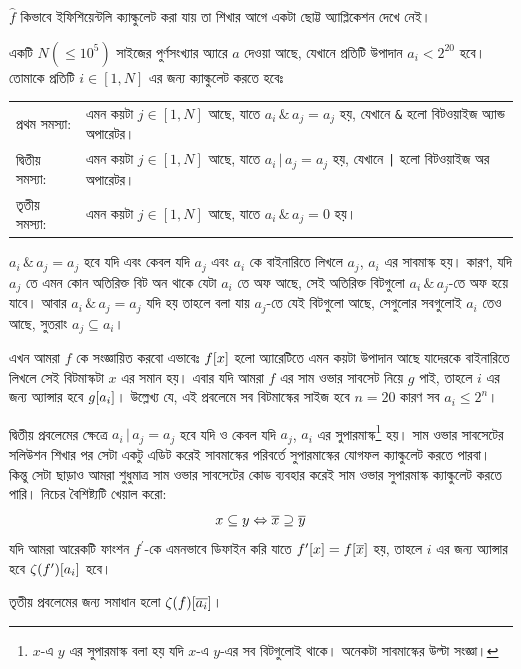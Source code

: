 $\hat{f}$ কিভাবে ইফিশিয়েন্টলি ক্যাল্কুলেট করা যায় তা শিখার আগে একটা ছোট্ট
অ্যাপ্লিকেশন দেখে নেই।

\begin{example}
  একটি $N (\le 10^5)$ সাইজের পুর্ণসংখ্যার অ্যারে $a$ দেওয়া আছে, যেখানে
  প্রতিটি উপাদান $a_i < 2^{20}$ হবে। তোমাকে প্রতিটি $i \in [1, N]$ এর জন্য
  ক্যাল্কুলেট করতে হবেঃ
  \begin{center}
    \begin{tabularx}{\textwidth}{l X}
      প্রথম সমস্যা: & এমন কয়টা $j \in [1, N]$ আছে, যাতে $a_i \, \texttt{\&}
      \, a_j = a_j$ হয়, যেখানে \texttt{\&} হলো বিটওয়াইজ অ্যান্ড অপারেটর।\\
      দ্বিতীয় সমস্যা: & এমন কয়টা $j \in [1, N]$ আছে, যাতে $a_i \, \texttt{|}
      \, a_j = a_j$ হয়, যেখানে \texttt{|} হলো বিটওয়াইজ অর অপারেটর।\\
      তৃতীয় সমস্যা: & এমন কয়টা $j \in [1, N]$ আছে, যাতে $a_i \, \texttt{\&}
      \, a_j = 0$ হয়।
    \end{tabularx} 
  \end{center}
\end{example}

\begin{solution}
  $a_i \, \texttt{\&} \, a_j = a_j$ হবে যদি এবং কেবল যদি $a_j$ এবং $a_i$ কে
  বাইনারিতে লিখলে $a_j$, $a_i$ এর সাবমাস্ক হয়। কারণ, যদি $a_j$ তে এমন কোন
  অতিরিক্ত বিট অন থাকে যেটা $a_i$ তে অফ আছে, সেই অতিরিক্ত বিটগুলো $a_i \,
  \texttt{\&} \, a_j$-তে অফ হয়ে যাবে। আবার $a_i \, \texttt{\&} \, a_j =
  a_j$ যদি হয় তাহলে বলা যায় $a_j$-তে যেই বিটগুলো আছে, সেগুলোর সবগুলোই $a_i$
  তেও আছে, সুতরাং $a_j \subseteq a_i$।
  
  এখন আমরা $f$ কে সংজ্ঞায়িত করবো
  এভাবেঃ $f[x]$ হলো অ্যারেটিতে এমন কয়টা উপাদান আছে যাদেরকে বাইনারিতে
  লিখলে সেই বিটমাস্কটা $x$ এর সমান হয়। এবার যদি আমরা $f$ এর সাম ওভার সাবসেট
  নিয়ে $g$ পাই, তাহলে $i$ এর জন্য অ্যান্সার হবে $g[a_i]$। উল্লেখ্য যে, এই
  প্রবলেমে সব বিটমাস্কের সাইজ হবে $n = 20$ কারণ সব $a_i \le 2^n$।

  দ্বিতীয় প্রবলেমের ক্ষেত্রে $a_i \, \texttt{|} \, a_j = a_j$ হবে যদি ও কেবল
  যদি $a_j$, $a_i$ এর সুপারমাস্ক\footnote{$x$-এ $y$ এর সুপারমাস্ক বলা হয় যদি
  $x$-এ $y$-এর সব বিটগুলোই থাকে। অনেকটা সাবমাস্কের উল্টা সংজ্ঞা।} হয়। সাম
  ওভার সাবসেটের সলিউশন শিখার পর সেটা একটু এডিট করেই সাবমাস্কের পরিবর্তে
  সুপারমাস্কের যোগফল ক্যাল্কুলেট করতে পারবা। কিন্তু সেটা ছাড়াও আমরা শুধুমাত্র
  সাম ওভার সাবসেটের কোড ব্যবহার করেই সাম ওভার সুপারমাস্ক ক্যাল্কুলেট করতে
  পারি। নিচের বৈশিষ্ট্যটি খেয়াল করো:
  \[
    x \subseteq y \Leftrightarrow \overline{x} \supseteq \overline{y}
  \]
  যদি আমরা আরেকটি ফাংশন $f^\prime$-কে এমনভাবে ডিফাইন করি যাতে
  $f^\prime[x] = f[\overline{x}]$ হয়, তাহলে $i$ এর জন্য অ্যান্সার হবে
  $\zeta(f^\prime)[a_i]$ হবে।

  তৃতীয় প্রবলেমের জন্য সমাধান হলো $\zeta(f)[\overline{a_i}]$।
\end{solution}

